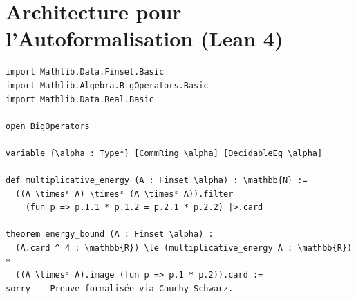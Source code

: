 \documentclass[11pt,a4paper]{article}
\begin{document}
\section{Architecture pour l'Autoformalisation (Lean 4)}
\begin{verbatim}
import Mathlib.Data.Finset.Basic
import Mathlib.Algebra.BigOperators.Basic
import Mathlib.Data.Real.Basic

open BigOperators

variable {\alpha : Type*} [CommRing \alpha] [DecidableEq \alpha]

def multiplicative_energy (A : Finset \alpha) : \mathbb{N} :=
  ((A \timesˢ A) \timesˢ (A \timesˢ A)).filter
    (fun p => p.1.1 * p.1.2 = p.2.1 * p.2.2) |>.card

theorem energy_bound (A : Finset \alpha) :
  (A.card ^ 4 : \mathbb{R}) \le (multiplicative_energy A : \mathbb{R}) *
  ((A \timesˢ A).image (fun p => p.1 * p.2)).card :=
sorry -- Preuve formalisée via Cauchy-Schwarz.
\end{verbatim}
\end{document}
